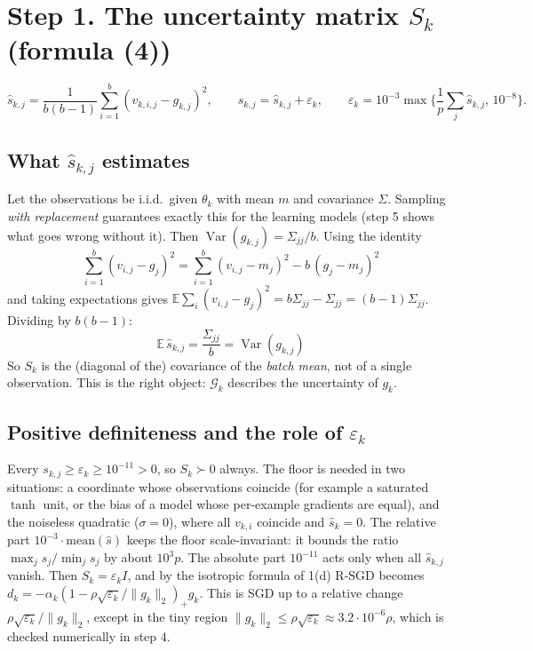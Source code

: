 \documentclass[11pt,a4paper]{article}
\newcommand{\G}{\mathcal{G}_k}
\newcommand{\norm}[1]{\lVert #1\rVert_2}
\newcommand{\E}{\mathbb{E}}
\DeclareMathOperator{\Var}{Var}
\begin{document}
\section*{Step 1. The uncertainty matrix $S_k$ (formula (4))}

\begin{equation*}
\widehat s_{k,j}=\frac1{b(b-1)}\sum_{i=1}^b(v_{k,i,j}-g_{k,j})^2,\qquad
s_{k,j}=\widehat s_{k,j}+\varepsilon_k,\qquad
\varepsilon_k=10^{-3}\max\Big\{\frac1p\sum_j\widehat s_{k,j},\,10^{-8}\Big\}.
\end{equation*}

\subsection*{What $\widehat s_{k,j}$ estimates}

Let the observations be i.i.d.\ given $\theta_k$ with mean $m$ and covariance
$\Sigma$. Sampling \emph{with replacement} guarantees exactly this for the learning
models (step 5 shows what goes wrong without it). Then
$\Var(g_{k,j})=\Sigma_{jj}/b$. Using the identity
\begin{equation*}
\sum_{i=1}^b(v_{i,j}-g_j)^2=\sum_{i=1}^b(v_{i,j}-m_j)^2-b\,(g_j-m_j)^2
\end{equation*}
and taking expectations gives $\E\sum_i(v_{i,j}-g_j)^2=b\Sigma_{jj}-\Sigma_{jj}
=(b-1)\Sigma_{jj}$. Dividing by $b(b-1)$:
\begin{equation*}
\boxed{\;\E\,\widehat s_{k,j}=\frac{\Sigma_{jj}}b=\Var(g_{k,j})\;}
\end{equation*}
So $S_k$ is the (diagonal of the) covariance of the \emph{batch mean}, not of a single
observation. This is the right object: $\G$ describes the uncertainty of $g_k$.

\subsection*{Positive definiteness and the role of $\varepsilon_k$}

Every $s_{k,j}\ge\varepsilon_k\ge10^{-11}>0$, so $S_k\succ0$ always. The floor is
needed in two situations: a coordinate whose observations coincide (for example a
saturated $\tanh$ unit, or the bias of a model whose per-example gradients are equal),
and the noiseless quadratic ($\sigma=0$), where all $v_{k,i}$ coincide and
$\widehat s_k=0$. The relative part $10^{-3}\cdot\text{mean}(\widehat s)$ keeps the
floor scale-invariant: it bounds the ratio $\max_js_j/\min_js_j$ by about $10^3p$.
The absolute part $10^{-11}$ acts only when all $\widehat s_{k,j}$ vanish. Then
$S_k=\varepsilon_kI$, and by the isotropic formula of 1(d) R-SGD becomes
$d_k=-\alpha_k(1-\rho\sqrt{\varepsilon_k}/\norm{g_k})_+g_k$. This is SGD up to a
relative change $\rho\sqrt{\varepsilon_k}/\norm{g_k}$, except in the tiny region
$\norm{g_k}\le\rho\sqrt{\varepsilon_k}\approx3.2\cdot10^{-6}\rho$, which is checked
numerically in step 4.
\end{document}

